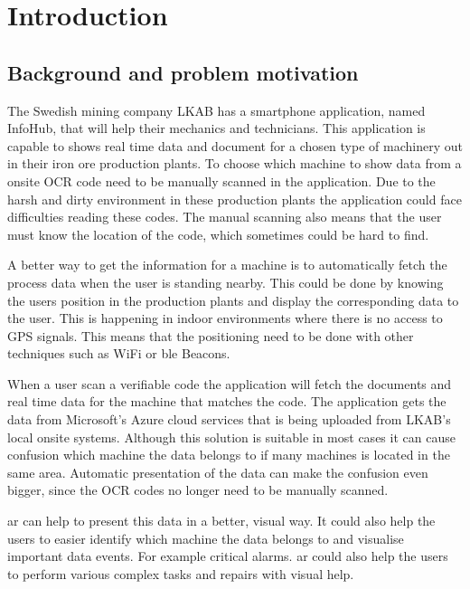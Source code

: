 \chapter{Introduction}\label{introduction} 

\section{Background and problem motivation} The Swedish mining company LKAB has
a smartphone application, named InfoHub, that will help their mechanics and
technicians.  This application is capable to shows real time data and document
for a chosen type of machinery out in their iron ore production plants.  To
choose which machine to show data from a onsite OCR code need to be manually
scanned in the application.  Due to the harsh and dirty environment in these
production plants the application could face difficulties reading these codes.
The manual scanning also means that the user must know the location of the code,
which sometimes could be hard to find.

\bigskip

A better way to get the information for a machine is to automatically fetch the
process data when the user is standing nearby.  This could be done by knowing
the users position in the production plants and display the corresponding data
to the user.  This is happening in indoor environments where there is no access
to GPS signals.  This means that the positioning need to be done with other
techniques such as WiFi or \acrlong{ble} Beacons.

\bigskip

When a user scan a verifiable code the application will fetch the documents and
real time data for the machine that matches the code.  The application gets the
data from Microsoft's Azure cloud services that is being uploaded from LKAB's
local onsite systems.  Although this solution is suitable in most cases it can
cause confusion which machine the data belongs to if many machines is located in
the same area.  Automatic presentation of the data can make the confusion even
bigger, since the OCR codes no longer need to be manually scanned.

\bigskip

\acrfull{ar} can help to present this data in a better, visual way.  It could
also help the users to easier identify which machine the data belongs to and
visualise important data events.  For example critical alarms.  \acrshort{ar}
could also help the users to perform various complex tasks and repairs with
visual help.


